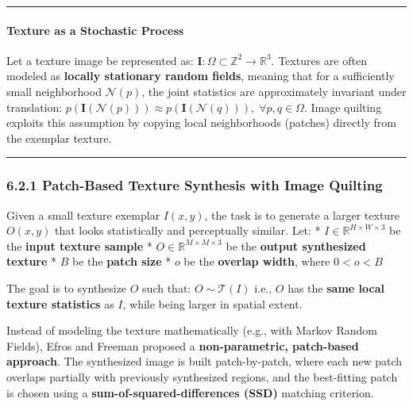 \documentclass[11pt]{article}
\begin{document}
\begin{center}\rule{0.5\linewidth}{0.5pt}\end{center}

\hypertarget{texture-as-a-stochastic-process}{%
\paragraph{\texorpdfstring{\textbf{Texture as a Stochastic
Process}}{Texture as a Stochastic Process}}\label{texture-as-a-stochastic-process}}

Let a texture image be represented as:
\(\mathbf{I} : \Omega \subset \mathbb{Z}^2 \rightarrow \mathbb{R}^3\).
Textures are often modeled as \textbf{locally stationary random fields},
meaning that for a sufficiently small neighborhood \(\mathcal{N}(p)\),
the joint statistics are approximately invariant under translation:
\(p(\mathbf{I}(\mathcal{N}(p))) \approx p(\mathbf{I}(\mathcal{N}(q))), \; \forall{p, q \in \Omega}\).
Image quilting exploits this assumption by copying local neighborhoods
(patches) directly from the exemplar texture.

\begin{center}\rule{0.5\linewidth}{0.5pt}\end{center}

\hypertarget{patch-based-texture-synthesis-with-image-quilting}{%
\subsubsection{\texorpdfstring{\textbf{6.2.1 Patch-Based Texture
Synthesis with Image
Quilting}}{6.2.1 Patch-Based Texture Synthesis with Image Quilting}}\label{patch-based-texture-synthesis-with-image-quilting}}

Given a small texture exemplar \(I(x, y)\), the task is to generate a
larger texture \(O(x, y)\) that looks statistically and perceptually
similar. Let: * \(I \in \mathbb{R}^{H \times W \times 3}\) be the
\textbf{input texture sample} *
\(O \in \mathbb{R}^{M \times M \times 3}\) be the \textbf{output
synthesized texture} * \(B\) be the \textbf{patch size} * \(o\) be the
\textbf{overlap width}, where \(0 < o < B\)

The goal is to synthesize \(O\) such that: \(O \sim \mathcal{T}(I)\)
i.e., \(O\) has the \textbf{same local texture statistics} as \(I\),
while being larger in spatial extent.

Instead of modeling the texture mathematically (e.g., with Markov Random
Fields), Efros and Freeman proposed a \textbf{non-parametric,
patch-based approach}. The synthesized image is built patch-by-patch,
where each new patch overlaps partially with previously synthesized
regions, and the best-fitting patch is chosen using a
\textbf{sum-of-squared-differences (SSD)} matching criterion.
\end{document}
